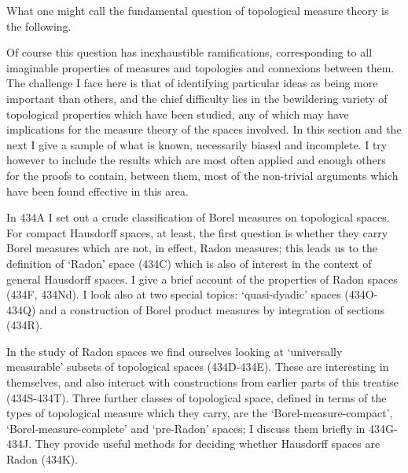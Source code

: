 
\def\Yprod#1{\prod_{i\in#1}Y_i}

\def\chaptername{Topologies and measures II}
\def\sectionname{Borel measures}


What one might call the fundamental question of topological measure
theory is the following.


\noindent Of course this question has inexhaustible ramifications,
corresponding to all imaginable properties of measures and topologies
and connexions between them.   The challenge I face here is that of
identifying particular ideas as being more important than others, and
the chief difficulty lies in the bewildering variety of topological
properties which have been studied, any of which may have implications
for the measure theory of the spaces involved.   In this section and the
next I give a sample of what is known, necessarily biased and
incomplete.   I try however to include the results which are most often
applied and enough others for the proofs to contain, between them, most
of the non-trivial arguments which have been found effective in this
area.

In 434A I set out a crude classification of Borel measures on
topological spaces.   For compact Hausdorff spaces, at least, the first
question is whether they carry Borel measures which are not, in effect,
Radon measures;  this leads us to the definition of `Radon' space (434C)
which is also of interest in the context of general Hausdorff spaces.
I give a brief account of the properties of Radon spaces (434F, 434Nd).
I look also at two special topics:
`quasi-dyadic' spaces (434O-434Q) and a
construction of Borel product measures by integration of sections
(434R).

In the study of Radon spaces we find ourselves looking at `universally
measurable' subsets of topological spaces (434D-434E).   These are
interesting in themselves, and also interact with constructions
from earlier parts of this treatise (434S-434T).
Three further classes of topological space, defined in terms of the
types of topological measure which they carry, are the
`Borel-measure-compact', `Borel-measure-complete' and `pre-Radon'
spaces;  I discuss them briefly in 434G-434J.   They provide useful
methods for deciding whether Hausdorff spaces are Radon (434K).

